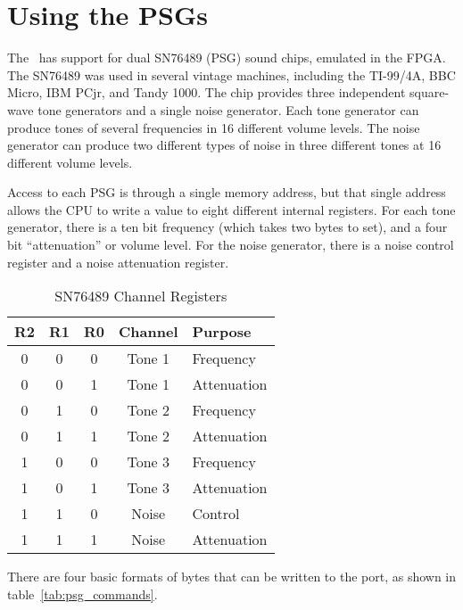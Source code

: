 \section*{Using the PSGs}

The \jr\ has support for dual SN76489 (PSG) sound chips, emulated in the FPGA. The SN76489 was used in several vintage machines, including the TI-99/4A, BBC Micro, IBM PCjr, and Tandy 1000. The chip provides three independent square-wave tone generators and a single noise generator. Each tone generator can produce tones of several frequencies in 16 different volume levels. The noise generator can produce two different types of noise in three different tones at 16 different volume levels.

Access to each PSG is through a single memory address, but that single address allows the CPU to write a value to eight different internal registers. For each tone generator, there is a ten bit frequency (which takes two bytes to set), and a four bit ``attenuation'' or volume level. For the noise generator, there is a noise control register and a noise attenuation register.

\begin{table}[ht]
	\begin{center}
		\begin{tabular}{|c|c|c|c|l|} \hline
			R2 & R1 & R0 & Channel & Purpose \\ \hline \hline
			0 & 0 & 0 & Tone 1 & Frequency \\ \hline
			0 & 0 & 1 & Tone 1 & Attenuation \\ \hline
			0 & 1 & 0 & Tone 2 & Frequency \\ \hline
			0 & 1 & 1 & Tone 2 & Attenuation \\ \hline
			1 & 0 & 0 & Tone 3 & Frequency \\ \hline
			1 & 0 & 1 & Tone 3 & Attenuation \\ \hline
			1 & 1 & 0 & Noise & Control \\ \hline
			1 & 1 & 1 & Noise & Attenuation \\ \hline
		\end{tabular}
		\caption{SN76489 Channel Registers}
	\end{center}
	\label{tab:psg_registers}
\end{table}

There are four basic formats of bytes that can be written to the port, as shown in table~\ref{tab:psg_commands}.

